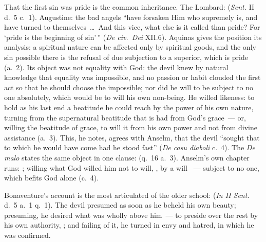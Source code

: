 That the first sin was pride is the common inheritance. The Lombard:
 (\emph{Sent.} II d.~5 c.~1). Augustine: the bad angels ``have
forsaken Him who supremely is, and have turned to themselves~\dots\ And
this vice, what else is it called than pride? For `pride is the beginning
of sin'\,'' (\emph{De civ.\ Dei} XII.6). Aquinas gives the position its
analysis: a spiritual nature can be affected only by spiritual goods, and
the only sin possible there is the refusal of due subjection to a
superior, which is pride (a.~2). Its object was not equality with God:
the devil knew by natural knowledge that equality was impossible, and no
passion or habit clouded the first act so that he should choose the
impossible; nor did he will to be subject to no one absolutely, which
would be to will his own non-being. He willed likeness: to hold as his
last end a beatitude he could reach by the power of his own nature,
turning from the supernatural beatitude that is had from God's grace~---
or, willing the beatitude of grace, to will it from his own power and not
from divine assistance (a.~3). This, he notes, agrees with Anselm, that
the devil ``sought that to which he would have come had he stood fast''
(\emph{De casu diaboli} c.~4). The \emph{De malo} states the same object
in one clause: 
(q.~16 a.~3). Anselm's own chapter runs: ; willing what
God willed him not to will, ,
by a will ~--- subject to no one, which befits God
alone (c.~4).

Bonaventure's account is the most articulated of the older school:
 (\emph{In II Sent.} d.~5 a.~1 q.~1). The devil presumed as
soon as he beheld his own beauty; presuming, he desired what was wholly
above him~--- to preside over the rest by his own authority, ;
and failing of it, he turned in envy and hatred, in which he was
confirmed.

